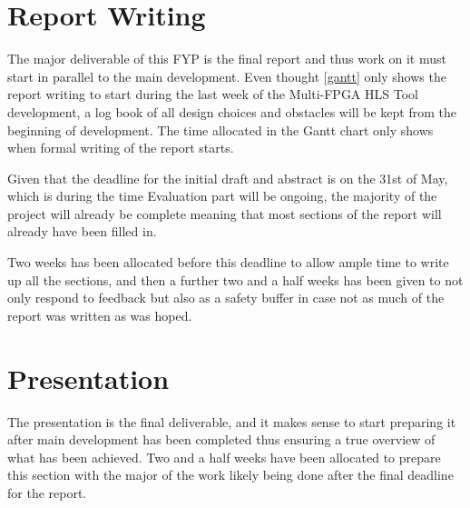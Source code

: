 \section{Report Writing}

The major deliverable of this FYP is the final report and thus work on it must start in parallel to the main development. Even thought \autoref{gantt} only shows the report writing to start during the last week of the Multi-FPGA HLS Tool development, a log book of all design choices and obstacles will be kept from the beginning of development. The time allocated in the Gantt chart only shows when formal writing of the report starts. 

Given that the deadline for the initial draft and abstract is on the 31st of May, which is during the time Evaluation part will be ongoing, the majority of the project will already be complete meaning that most sections of the report will already have been filled in.

Two weeks has been allocated before this deadline to allow ample time to write up all the sections, and then a further two and a half weeks has been given to not only respond to feedback but also as a safety buffer in case not as much of the report was written as was hoped.

\section{Presentation}

The presentation is the final deliverable, and it makes sense to start preparing it after main development has been completed thus ensuring a true overview of what has been achieved. Two and a half weeks have been allocated to prepare this section with the major of the work likely being done after the final deadline for the report.